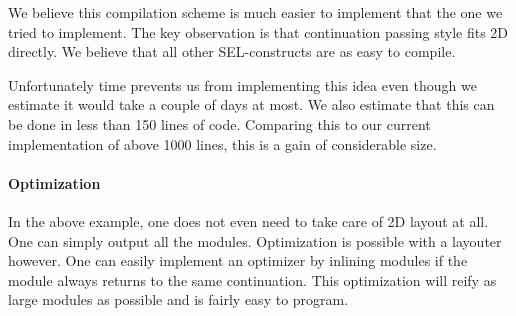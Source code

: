 We believe this compilation scheme is much easier to implement that
the one we tried to implement. The key observation is that
continuation passing style fits 2D directly. We believe that all other
SEL-constructs are as easy to compile.

Unfortunately time prevents us from implementing this idea even though
we estimate it would take a couple of days at most. We also estimate
that this can be done in less than 150 lines of code. Comparing this
to our current implementation of above 1000 lines, this is a gain of
considerable size.

\paragraph{Optimization}
\label{sec:optimization}

In the above example, one does not even need to take care of 2D layout
at all. One can simply output all the modules. Optimization is
possible with a layouter however. One can easily implement an
optimizer by inlining modules if the module always returns to the same
continuation. This optimization will reify as large modules as
possible and is fairly easy to program.



